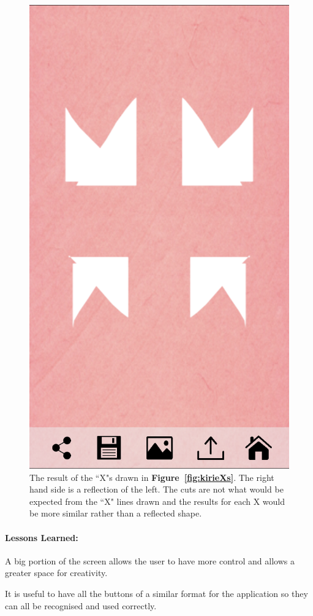 \documentclass[11pt]{article}
\begin{document}
\begin{figure}[!ht]
\begin{minipage}{0.45\textwidth}
                            \includegraphics[width=0.7\linewidth]{Images/kirieCut.png}
                            \caption{The result of the ``X"s drawn in \textbf{Figure~\ref{fig:kirieXs}}. The right hand side is a reflection of the left. The cuts are not what would be expected from the ``X" lines drawn and the results for each X would be more similar rather than a reflected shape.}
                            \label{fig:kirieCut}
                        \end{minipage}
                    \end{figure}
                
                \paragraph{Lessons Learned:}   
                A big portion of the screen allows the user to have more control and allows a greater space for creativity.
                
                It is useful to have all the buttons of a similar format for the application so they can all be recognised and used correctly.
                
\end{document}
